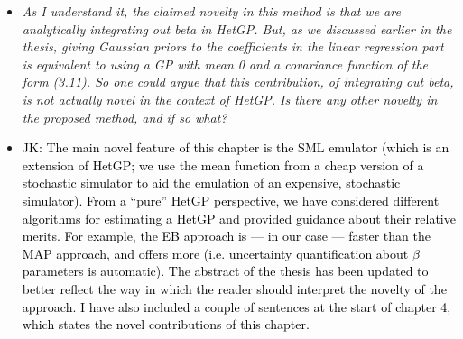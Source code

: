 \documentclass[12pt]{article}
\newcommand{\done}[2]{\item[#1]\textit{#2}}
\newcommand{\jack}[1]{\item{\textcolor{black}{JK: #1}}}
\begin{document}
\begin{itemize}
\done{P91}{As I understand it, the claimed novelty in this method is that we are analytically integrating out beta in HetGP.  But, as we discussed earlier in the thesis, giving Gaussian priors to the coefficients in the linear regression part is equivalent to using a GP with mean 0 and a covariance function of the form (3.11).  So one could argue that this contribution, of integrating out beta, is not actually novel in the context of HetGP.  Is there any other novelty in the proposed method, and if so what?}

\jack{The main novel feature of this chapter is the SML emulator (which is an extension of HetGP; we use the mean function from a cheap version of a stochastic simulator to aid the emulation of an expensive, stochastic simulator). From a ``pure'' HetGP perspective, we have considered different algorithms for estimating a HetGP and provided guidance about their relative merits. For example, the EB approach is --- in our case --- faster than the MAP approach, and offers more (i.e. uncertainty quantification about $\beta$ parameters is automatic). The abstract of the thesis has been updated to better reflect the way in which the reader should interpret the novelty of the approach. I have also included a couple of sentences at the start of chapter 4, which states the novel contributions of this chapter.}

\end{itemize}
\newpage
\end{document}
